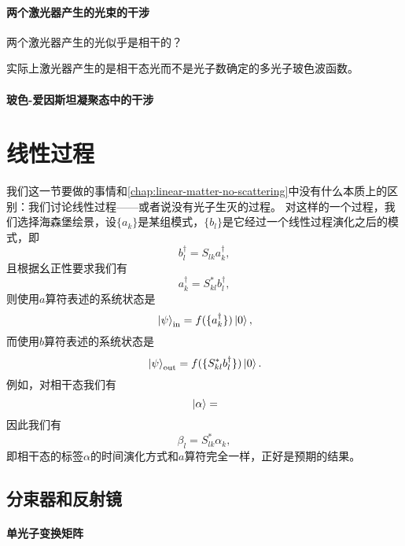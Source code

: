 \subsubsection{两个激光器产生的光束的干涉}

两个激光器产生的光似乎是相干的？

实际上激光器产生的是相干态光而不是光子数确定的多光子玻色波函数。

\subsubsection{玻色-爱因斯坦凝聚态中的干涉}

\chapter{线性过程}

我们这一节要做的事情和\autoref{chap:linear-matter-no-scattering}中没有什么本质上的区别：我们讨论线性过程——或者说没有光子生灭的过程。
对这样的一个过程，我们选择海森堡绘景，设$\{a_k\}$是某组模式，$\{b_l \}$是它经过一个线性过程演化之后的模式，即\begin{equation}
    b_l^\dagger = S_{lk} a^\dagger_k,
\end{equation}
且根据幺正性要求我们有
\begin{equation}
    a_k^\dagger = S_{kl}^* b^\dagger_l,
\end{equation}
则使用$a$算符表述的系统状态是
\begin{equation}
    \ket*{\psi}_\text{in} = f(\{ a_k^\dagger \}) \ket*{0},
\end{equation}
而使用$b$算符表述的系统状态是
\begin{equation}
    \ket*{\psi}_\text{out} = f(\{ S_{kl}^* b_l^\dagger \}) \ket*{0}.
\end{equation}
例如，对相干态我们有
\begin{equation}
    \ket*{\alpha} = 
\end{equation}
因此我们有
\begin{equation}
    \beta_l = S_{lk}^* \alpha_k ,
\end{equation}
即相干态的标签$\alpha$的时间演化方式和$a$算符完全一样，正好是预期的结果。

\section{分束器和反射镜}

\subsubsection{单光子变换矩阵}


